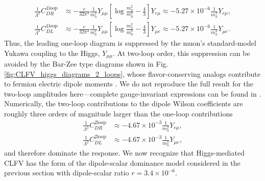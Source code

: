 \documentclass{book}[letterpaper,12pt]
\begin{document}
\begin{equation}
\begin{split}
\frac{1}{\Lambda^2}C_{DR}^{1\mathrm{loop}}&\approx-\frac{e}{32\pi^2}\frac{1}{m_h^2}Y_{\mu\mu}\left[\log\frac{m_h^2}{m_{\mu}^2}-\frac{4}{3}\right]Y_{e\mu}\approx -5.27\times 10^{-6}\frac{1}{m_h^2}Y_{e\mu},\\
\frac{1}{\Lambda^2}C_{DL}^{1\mathrm{loop}}&\approx-\frac{e}{32\pi^2}\frac{1}{m_h^2}Y_{\mu\mu}\left[\log\frac{m_h^2}{m_{\mu}^2}-\frac{4}{3}\right]Y_{\mu e}\approx -5.27\times 10^{-6}\frac{1}{m_h^2}Y_{\mu e}.
\end{split}
\end{equation}
Thus, the leading one-loop diagram is suppressed by the muon's standard-model Yukawa coupling to the Higgs, $Y_{\mu\mu}$. At two-loop order, this suppression can be avoided by the Bar-Zee type diagrams shown in Fig. \ref{fig:CLFV_higgs_diagrams_2_loops}, whose flavor-conserving analogs contribute to fermion electric dipole moments \cite{PhysRevLett.65.21,Abe:2013qla}. We do not reproduce the full result for the two-loop amplitudes here---complete gauge-invariant expressions can be found in \cite{Cirigliano:2021img}. Numerically, the two-loop contributions to the dipole Wilson coefficients are roughly three orders of magnitude larger than the one-loop contributions
\begin{equation}
\begin{split}
\frac{1}{\Lambda^2}C_{DR}^{2\mathrm{loop}}&\approx -4.67\times 10^{-3}\frac{1}{m_h^2}Y_{e\mu},\\
\frac{1}{\Lambda^2}C_{DL}^{2\mathrm{loop}}&\approx -4.67\times 10^{-3}\frac{1}{m_h^2}Y_{\mu e},
\end{split}
\end{equation}
and therefore dominate the response. We now recognize that Higgs-mediated CLFV has the form of the dipole-scalar dominance model considered in the previous section with dipole-scalar ratio $r=3.4\times 10^{-6}$. 
\end{document}
